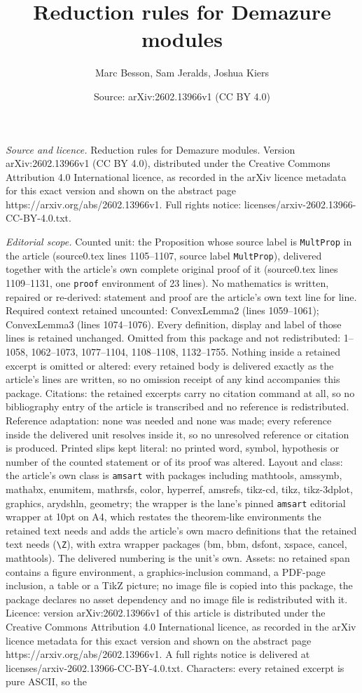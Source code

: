 \documentclass[10pt,a4paper]{amsart}
\title[Reduction rules for Demazure modules]{Reduction rules for Demazure modules}
\author{Marc Besson, Sam Jeralds, Joshua Kiers}
\date{Source: arXiv:2602.13966v1 (CC BY 4.0)}
\begin{document}
\maketitle

\noindent\emph{Source and licence.} Reduction rules for Demazure modules. Version arXiv:2602.13966v1 (CC BY 4.0), distributed under the Creative Commons Attribution 4.0 International licence, as recorded in the arXiv licence metadata for this exact version and shown on the abstract page https://arxiv.org/abs/2602.13966v1. Full rights notice: licenses/arxiv-2602.13966-CC-BY-4.0.txt.\par\smallskip

\noindent\textit{Editorial scope.} Counted unit: the Proposition whose source label is \texttt{MultProp} in the article (source0.tex lines 1105--1107, source label \texttt{MultProp}), delivered together with the article's own complete original proof of it (source0.tex lines 1109--1131, one \texttt{proof} environment of 23 lines). No mathematics is written, repaired or re-derived: statement and proof are the article's own text line for line. Required context retained uncounted: ConvexLemma2 (lines 1059--1061); ConvexLemma3 (lines 1074--1076). Every definition, display and label of those lines is retained unchanged. Omitted from this package and not redistributed: 1--1058, 1062--1073, 1077--1104, 1108--1108, 1132--1755. Nothing inside a retained excerpt is omitted or altered: every retained body is delivered exactly as the article's lines are written, so no omission receipt of any kind accompanies this package. Citations: the retained excerpts carry no citation command at all, so no bibliography entry of the article is transcribed and no reference is redistributed. Reference adaptation: none was needed and none was made; every reference inside the delivered unit resolves inside it, so no unresolved reference or citation is produced. Printed slips kept literal: no printed word, symbol, hypothesis or number of the counted statement or of its proof was altered. Layout and class: the article's own class is \texttt{amsart} with packages including mathtools, amssymb, mathabx, enumitem, mathrsfs, color, hyperref, amsrefs, tikz-cd, tikz, tikz-3dplot, graphics, arydshln, geometry; the wrapper is the lane's pinned \texttt{amsart} editorial wrapper at 10pt on A4, which restates the theorem-like environments the retained text needs and adds the article's own macro definitions that the retained text needs (\texttt{\textbackslash Z}), with extra wrapper packages (bm, bbm, dsfont, xspace, cancel, mathtools). The delivered numbering is the unit's own. Assets: no retained span contains a figure environment, a graphics-inclusion command, a PDF-page inclusion, a table or a TikZ picture; no image file is copied into this package, the package declares no asset dependency and no image file is redistributed with it. Licence: version arXiv:2602.13966v1 of this article is distributed under the Creative Commons Attribution 4.0 International licence, as recorded in the arXiv licence metadata for this exact version and shown on the abstract page https://arxiv.org/abs/2602.13966v1. A full rights notice is delivered at licenses/arxiv-2602.13966-CC-BY-4.0.txt. Characters: every retained excerpt is pure ASCII, so the 
\end{document}
